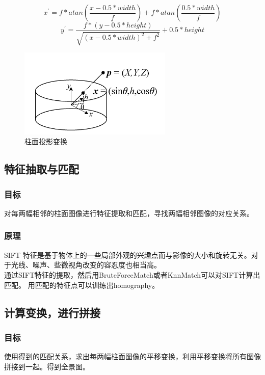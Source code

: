 \documentclass{article}
\begin{document}
\begin{equation}
x^{'}=f*atan\left(\frac {x-0.5*width}{f}\right)+f*atan\left( \frac {0.5*width}{f}\right)
\end{equation}
\begin{equation}
y^{'}=\frac {f*(y-0.5*height)}{\sqrt {(x-0.5*width)^2+f^2}}+0.5*height
\end{equation}
\begin{figure}[H]
\begin{center}
\includegraphics[width=0.65\textwidth]{transform} %
\caption{柱面投影变换}
\end{center}
\end{figure}


\subsection{特征抽取与匹配}
\subsubsection{目标}
对每两幅相邻的柱面图像进行特征提取和匹配，寻找两幅相邻图像的对应关系。
\subsubsection{原理}
SIFT 特征是基于物体上的一些局部外观的兴趣点而与影像的大小和旋转无关。对于光线、噪声、些微视角改变的容忍度也相当高。\\
通过SIFT特征的提取，然后用BruteForceMatch或者KnnMatch可以对SIFT计算出匹配。
用匹配的特征点可以训练出homography。
\subsection{计算变换，进行拼接}
\subsubsection{目标}
使用得到的匹配关系，求出每两幅柱面图像的平移变换，利用平移变换将所有图像拼接到一起。得到全景图。
\end{document}
